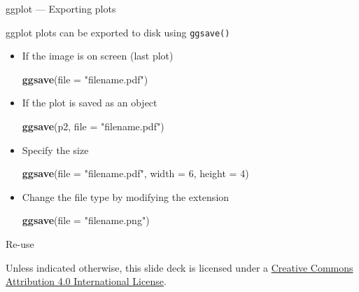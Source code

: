 \documentclass[10pt,ignorenonframetext,compress, aspectratio=169]{beamer}
\newenvironment{Shaded}{\begin{snugshade}}{\end{snugshade}}
\newcommand{\KeywordTok}[1]{\textcolor[rgb]{0.13,0.29,0.53}{\textbf{{#1}}}}
\newcommand{\DataTypeTok}[1]{\textcolor[rgb]{0.13,0.29,0.53}{{#1}}}
\newcommand{\DecValTok}[1]{\textcolor[rgb]{0.00,0.00,0.81}{{#1}}}
\newcommand{\StringTok}[1]{\textcolor[rgb]{0.31,0.60,0.02}{{#1}}}
\newcommand{\NormalTok}[1]{{#1}}
\begin{document}
\begin{frame}[fragile]{ggplot --- Exporting plots}

ggplot plots can be exported to disk using \texttt{ggsave()}

\begin{itemize}
\item
  If the image is on screen (last plot)

\begin{Shaded}
\begin{Highlighting}[]
\KeywordTok{ggsave}\NormalTok{(}\DataTypeTok{file =} \StringTok{"filename.pdf"}\NormalTok{)}
\end{Highlighting}
\end{Shaded}
\item
  If the plot is saved as an object

\begin{Shaded}
\begin{Highlighting}[]
\KeywordTok{ggsave}\NormalTok{(p2, }\DataTypeTok{file =} \StringTok{"filename.pdf"}\NormalTok{)}
\end{Highlighting}
\end{Shaded}
\item
  Specify the size

\begin{Shaded}
\begin{Highlighting}[]
\KeywordTok{ggsave}\NormalTok{(}\DataTypeTok{file =} \StringTok{"filename.pdf"}\NormalTok{, }\DataTypeTok{width =} \DecValTok{6}\NormalTok{, }\DataTypeTok{height =} \DecValTok{4}\NormalTok{)}
\end{Highlighting}
\end{Shaded}
\item
  Change the file type by modifying the extension

\begin{Shaded}
\begin{Highlighting}[]
\KeywordTok{ggsave}\NormalTok{(}\DataTypeTok{file =} \StringTok{"filename.png"}\NormalTok{)}
\end{Highlighting}
\end{Shaded}
\end{itemize}

\end{frame}

\begin{frame}{Re-use}

Unless indicated otherwise, this slide deck is licensed under a
\href{http://creativecommons.org/licenses/by/4.0/}{Creative Commons
Attribution 4.0 International License}.

\begin{center}
  \ccby
\end{center}

\end{frame}
\end{document}
